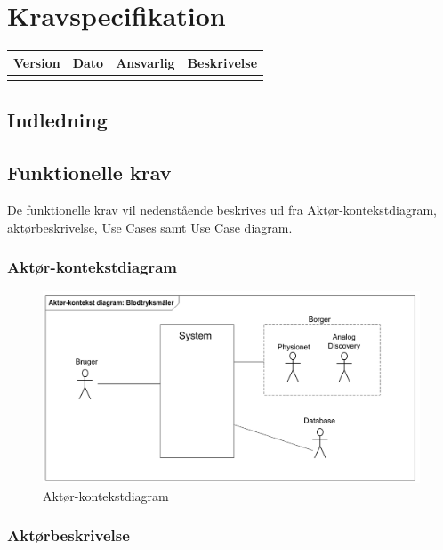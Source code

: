 \chapter{Kravspecifikation}

\begin{longtabu} to 
    Version &    Dato &    Ansvarlig &    Beskrivelse\\[-1ex]
    \midrule

\label{version_Systemark}
\end{longtabu}


\section{Indledning}


\section{Funktionelle krav}
De funktionelle krav vil nedenstående beskrives ud fra Aktør-kontekstdiagram, aktørbeskrivelse, Use Cases samt Use Case diagram. 

\subsection{Aktør-kontekstdiagram}
\begin{figure}[H]
	\centering
	\includegraphics[width=1\textwidth]{Figurer/Snip20150929_7}
	\caption{Aktør-kontekstdiagram}
	\label{fig:aktoerbeskrivelse}
\end{figure}



\subsection{Aktørbeskrivelse}

